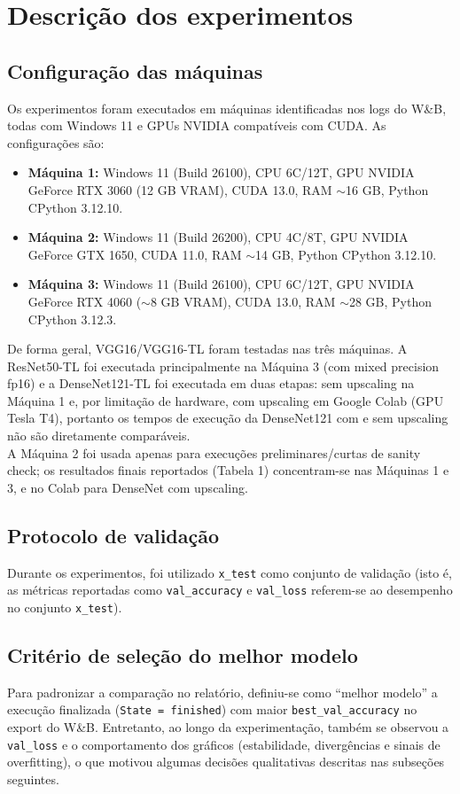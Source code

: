 \documentclass[12pt,a4paper]{article}
\begin{document}
\section{Descrição dos experimentos}

\subsection{Configuração das máquinas}
Os experimentos foram executados em máquinas identificadas nos logs do W\&B, todas com Windows 11 e GPUs NVIDIA compatíveis com CUDA. As configurações são:

\begin{itemize}
\item \textbf{Máquina 1:} Windows 11 (Build 26100), CPU 6C/12T, GPU NVIDIA GeForce RTX 3060 (12 GB VRAM), CUDA 13.0, RAM $\sim$16 GB, Python CPython 3.12.10.
\item \textbf{Máquina 2:} Windows 11 (Build 26200), CPU 4C/8T, GPU NVIDIA GeForce GTX 1650, CUDA 11.0, RAM $\sim$14 GB, Python CPython 3.12.10.
\item \textbf{Máquina 3:} Windows 11 (Build 26100), CPU 6C/12T, GPU NVIDIA GeForce RTX 4060 ($\sim$8 GB VRAM), CUDA 13.0, RAM $\sim$28 GB, Python CPython 3.12.3.
\end{itemize}

De forma geral, VGG16/VGG16-TL foram testadas nas três máquinas.
A ResNet50-TL foi executada principalmente na Máquina 3 (com mixed precision fp16) e a DenseNet121-TL foi executada em duas etapas: sem upscaling na Máquina 1 e, por limitação de hardware, com upscaling em Google Colab (GPU Tesla T4), portanto os tempos de execução da DenseNet121 com e sem upscaling não são diretamente comparáveis.\\
A Máquina 2 foi usada apenas para execuções preliminares/curtas de sanity check; os resultados finais reportados (Tabela 1) concentram-se nas Máquinas 1 e 3, e no Colab para DenseNet com upscaling.

\subsection{Protocolo de validação}
Durante os experimentos, foi utilizado \texttt{x\_test} como conjunto de validação (isto é, as métricas reportadas como \texttt{val\_accuracy} e \texttt{val\_loss} referem-se ao desempenho no conjunto \texttt{x\_test}).

\subsection{Critério de seleção do melhor modelo}
Para padronizar a comparação no relatório, definiu-se como ``melhor modelo'' a execução finalizada (\texttt{State = finished}) com maior \texttt{best\_val\_accuracy} no export do W\&B.
Entretanto, ao longo da experimentação, também se observou a \texttt{val\_loss} e o comportamento dos gráficos (estabilidade, divergências e sinais de overfitting), o que motivou algumas decisões qualitativas descritas nas subseções seguintes.
\end{document}
